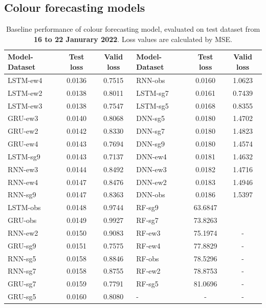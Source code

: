 \subsection{Colour forecasting models}

\begin{table}[!ht]
  \centering
  \caption{Baseline performance of colour forecasting model, evaluated on test dataset from \textbf{16 to 22 Janurary 2022}. Loss values are calculated by MSE.}\label{tab:baseline-result-jan-colour}
  \begin{NiceTabular}{lcclcc}
      \toprule
      Model-Dataset & Test loss & Valid loss & Model-Dataset & Test loss & Valid loss \\
      \midrule
      LSTM-ew4 & 0.0136 &0.7515&RNN-obs  & 0.0160 &1.0623 \\
      LSTM-ew2 & 0.0138 &0.8011&LSTM-sg7 & 0.0161 &0.7439 \\
      LSTM-ew3 & 0.0138 &0.7547&LSTM-sg5 & 0.0168 &0.8355 \\
      GRU-ew3  & 0.0140 &0.8068&DNN-sg5  & 0.0180 &1.4702 \\
      GRU-ew2  & 0.0142 &0.8330&DNN-sg7  & 0.0180 &1.4823 \\
      GRU-ew4  & 0.0143 &0.7694&DNN-sg9  & 0.0180 &1.4574 \\
      LSTM-sg9 & 0.0143 &0.7137&DNN-ew4  & 0.0181 &1.4632 \\
      RNN-ew3  & 0.0144 &0.8492&DNN-ew3  & 0.0182 &1.4716 \\
      RNN-ew4  & 0.0147 &0.8476&DNN-ew2  & 0.0183 &1.4946 \\
      RNN-sg9  & 0.0147 &0.8363&DNN-obs  & 0.0186 &1.5397 \\
      LSTM-obs & 0.0148 &0.9744&RF-sg9   & 63.6847& \\
      GRU-obs  & 0.0149 &0.9927&RF-sg7   & 73.8263& \\
      RNN-ew2  & 0.0150 &0.9083&RF-ew3   & 75.1974&- \\
      GRU-sg9  & 0.0151 &0.7575&RF-ew4   & 77.8829&- \\
      RNN-sg5  & 0.0158 &0.8846&RF-obs   & 78.5296&- \\
      RNN-sg7  & 0.0158 &0.8755&RF-ew2   & 78.8753&- \\
      GRU-sg7  & 0.0159 &0.7791&RF-sg5   & 81.0696&- \\
      GRU-sg5  & 0.0160 &0.8080&    -    &     -  &- \\
      \bottomrule
  \end{NiceTabular}
\end{table}


